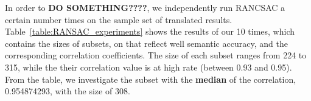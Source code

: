 
%







In order to \textbf{DO SOMETHING????}, we independently run RANCSAC a 
certain number times on the sample set of translated results. Table~\ref{table:RANSAC_experiments} shows the results of our 10 times, which contains the sizes of subsets, on that  {\model} reflect well semantic accuracy, and the corresponding correlation coefficients.
%
The size of each subset ranges from 224 to 315, while the their
correlation value is at high rate (between 0.93 and 0.95).  From the
table, we investigate the subset with the \textbf{median} of the correlation, 0.954874293, with the size of 308.

